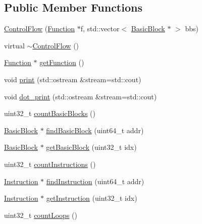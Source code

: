\subsection*{\-Public \-Member \-Functions}
\begin{DoxyCompactItemize}
\item 
\hyperlink{class_e_p_a_x_1_1_control_flow_aae2b7a80785816f4edc564f740e575c7}{\-Control\-Flow} (\hyperlink{class_e_p_a_x_1_1_function}{\-Function} $\ast$f, std\-::vector$<$ \hyperlink{class_e_p_a_x_1_1_basic_block}{\-Basic\-Block} $\ast$ $>$ bbs)
\item 
virtual \hyperlink{class_e_p_a_x_1_1_control_flow_a8823aec1b9b95147997176c3d649961f}{$\sim$\-Control\-Flow} ()
\item 
\hyperlink{class_e_p_a_x_1_1_function}{\-Function} $\ast$ \hyperlink{class_e_p_a_x_1_1_control_flow_ae8d9d902fd8c7d55d3a8492b9221ca90}{get\-Function} ()
\item 
void \hyperlink{class_e_p_a_x_1_1_control_flow_a5946e49014e4f689b6e9ec1f4d40d574}{print} (std\-::ostream \&stream=std\-::cout)
\item 
void \hyperlink{class_e_p_a_x_1_1_control_flow_a63fa0089dbc656ac9b862f6ac7e6f97a}{dot\-\_\-print} (std\-::ostream \&stream=std\-::cout)
\item 
uint32\-\_\-t \hyperlink{class_e_p_a_x_1_1_control_flow_a9c9e7392073a46b804756be6ad9e3b20}{count\-Basic\-Blocks} ()
\item 
\hyperlink{class_e_p_a_x_1_1_basic_block}{\-Basic\-Block} $\ast$ \hyperlink{class_e_p_a_x_1_1_control_flow_ae7c4d1a074d965533fd4b41acadf183e}{find\-Basic\-Block} (uint64\-\_\-t addr)
\item 
\hyperlink{class_e_p_a_x_1_1_basic_block}{\-Basic\-Block} $\ast$ \hyperlink{class_e_p_a_x_1_1_control_flow_ac0dfd67d0514dc086a13ba3969d8ae71}{get\-Basic\-Block} (uint32\-\_\-t idx)
\item 
uint32\-\_\-t \hyperlink{class_e_p_a_x_1_1_control_flow_ad68be1fbfb8a262bfb4812e1ccc769d8}{count\-Instructions} ()
\item 
\hyperlink{class_e_p_a_x_1_1_instruction}{\-Instruction} $\ast$ \hyperlink{class_e_p_a_x_1_1_control_flow_a4340905b7507964731967fd00ca5ce6f}{find\-Instruction} (uint64\-\_\-t addr)
\item 
\hyperlink{class_e_p_a_x_1_1_instruction}{\-Instruction} $\ast$ \hyperlink{class_e_p_a_x_1_1_control_flow_acdd2cfc96f19c5d0aa6ef884b0379808}{get\-Instruction} (uint32\-\_\-t idx)
\item 
uint32\-\_\-t \hyperlink{class_e_p_a_x_1_1_control_flow_aac44b527eddbacb18362a17efa5a3627}{count\-Loops} ()

\end{DoxyCompactItemize}
